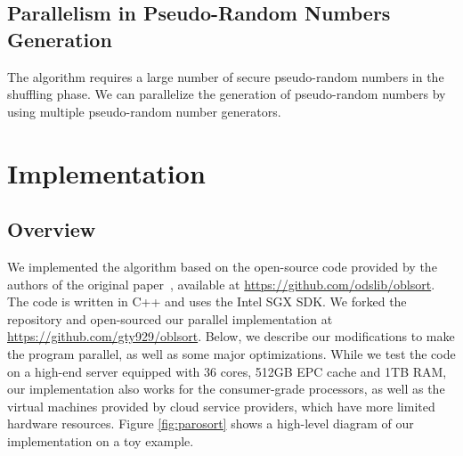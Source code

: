 \documentclass{article}
\begin{document}
\subsection{Parallelism in Pseudo-Random Numbers Generation}
The algorithm requires a large number of secure pseudo-random numbers in the shuffling phase. We can parallelize the generation of pseudo-random numbers by using multiple pseudo-random number generators.

\section{Implementation}
\subsection{Overview}
We implemented the algorithm based on the open-source code provided by the authors of the original paper~\cite{osort}, available at \url{https://github.com/odslib/oblsort}. The code is written in C++ and uses the Intel SGX SDK. We forked the repository and open-sourced our parallel implementation at \url{https://github.com/gty929/oblsort}. Below, we describe our modifications to make the program parallel, as well as some major optimizations. While we test the code on a high-end server equipped with 36 cores, 512GB EPC cache and 1TB RAM, our implementation also works for the consumer-grade processors, as well as the virtual machines provided by cloud service providers, which have more limited hardware resources. Figure \ref{fig:parosort} shows a high-level diagram of our implementation on a toy example.
\end{document}
